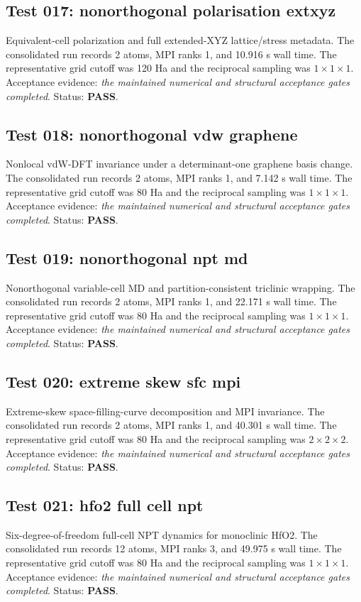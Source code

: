 \documentclass[aps,prb,preprint,superscriptaddress,longbibliography,floatfix]{revtex4-2}
\begin{document}
\subsection{Test 017: nonorthogonal polarisation extxyz}
Equivalent-cell polarization and full extended-XYZ lattice/stress metadata. The consolidated run records 2 atoms, MPI ranks 1, and 10.916 s wall time. The representative grid cutoff was 120 Ha and the reciprocal sampling was $1\times1\times1$. Acceptance evidence: \emph{the maintained numerical and structural acceptance gates completed}. Status: \textbf{PASS}.

\subsection{Test 018: nonorthogonal vdw graphene}
Nonlocal vdW-DFT invariance under a determinant-one graphene basis change. The consolidated run records 2 atoms, MPI ranks 1, and 7.142 s wall time. The representative grid cutoff was 80 Ha and the reciprocal sampling was $1\times1\times1$. Acceptance evidence: \emph{the maintained numerical and structural acceptance gates completed}. Status: \textbf{PASS}.

\subsection{Test 019: nonorthogonal npt md}
Nonorthogonal variable-cell MD and partition-consistent triclinic wrapping. The consolidated run records 2 atoms, MPI ranks 1, and 22.171 s wall time. The representative grid cutoff was 80 Ha and the reciprocal sampling was $1\times1\times1$. Acceptance evidence: \emph{the maintained numerical and structural acceptance gates completed}. Status: \textbf{PASS}.

\subsection{Test 020: extreme skew sfc mpi}
Extreme-skew space-filling-curve decomposition and MPI invariance. The consolidated run records 2 atoms, MPI ranks 1, and 40.301 s wall time. The representative grid cutoff was 80 Ha and the reciprocal sampling was $2\times2\times2$. Acceptance evidence: \emph{the maintained numerical and structural acceptance gates completed}. Status: \textbf{PASS}.

\subsection{Test 021: hfo2 full cell npt}
Six-degree-of-freedom full-cell NPT dynamics for monoclinic HfO2. The consolidated run records 12 atoms, MPI ranks 3, and 49.975 s wall time. The representative grid cutoff was 80 Ha and the reciprocal sampling was $1\times1\times1$. Acceptance evidence: \emph{the maintained numerical and structural acceptance gates completed}. Status: \textbf{PASS}.
\end{document}
